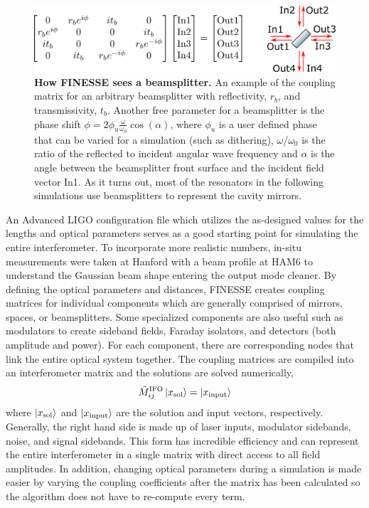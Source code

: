 	\begin{figure}[h]
		\centering
		\includegraphics[width=0.8 \textwidth]{../Figures/bs_matrix_pic.png}
		\caption[How FINESSE sees a beamsplitter.]
		{\textbf{How FINESSE sees a beamsplitter.} 	An example of the coupling matrix for an arbitrary beamsplitter with reflectivity, $r_b$, and transmissivity, $t_b$. Another free parameter for a beamsplitter is the phase shift $\phi = 2 \phi_u \frac{\omega}{\omega_0} \cos(\alpha)$, where $\phi_u$ is a user defined phase that can be varied for a simulation (such as dithering), $\omega$/$\omega_0$ is the ratio of the reflected to incident angular wave frequency and $\alpha$ is the angle between the beamsplitter front surface and the incident field vector In1.  As it turns out, most of the resonators in the following simulations use beamsplitters to represent the cavity mirrors.
		}
		\label{fig:FINESSE_bs}
	\end{figure}
	An Advanced LIGO configuration file \cite{FinesseH1} which utilizes the as-designed values for the lengths and optical parameters serves as a good starting point for simulating the entire interferometer.  To incorporate more realistic numbers, in-situ measurements were taken at Hanford with a beam profile at HAM6 to understand the Gaussian beam shape entering the output mode cleaner. By defining the optical parameters and distances, FINESSE creates coupling matrices for individual components which are generally comprised of mirrors, spaces, or beamsplitters.  Some specialized components are also useful such as modulators to create sideband fields, Faraday isolators, and detectors (both amplitude and power).  For each component, there are corresponding nodes that link the entire optical system together.  The coupling matrices are compiled into an interferometer matrix and the solutions are solved numerically,
	\begin{equation}
	\hat{M}_{ij}^{\text{IFO}} \ket{x_{\text{sol}}} = \ket{x_{\text{input}}}
	\end{equation}
	where $\ket{x_{\text{sol}}}$ and $\ket{x_{\text{input}}}$ are the solution and input vectors, respectively. Generally, the right hand side is made up of laser inputs, modulator sidebands, noise, and signal sidebands. This form has incredible efficiency and can represent the entire interferometer in a single matrix with direct access to all field amplitudes.  In addition, changing optical parameters during a simulation is made easier by varying the coupling coefficients after the matrix has been calculated so the algorithm does not have to re-compute every term.
